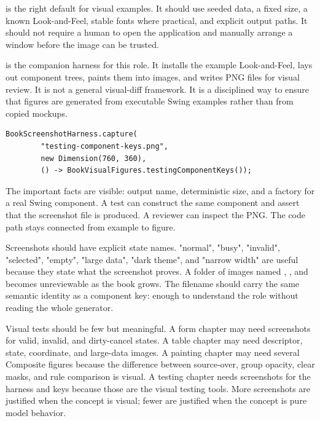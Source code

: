  is the right default for visual examples. It should use seeded data, a fixed size, a known Look-and-Feel, stable fonts where practical, and explicit output paths. It should not require a human to open the application and manually arrange a window before the image can be trusted.

 is the companion harness for this role. It installs the example Look-and-Feel, lays out component trees, paints them into images, and writes PNG files for visual review. It is not a general visual-diff framework. It is a disciplined way to ensure that figures are generated from executable Swing examples rather than from copied mockups.

\begin{lstlisting}[caption={The shape of a screenshot harness entry.}]
BookScreenshotHarness.capture(
        "testing-component-keys.png",
        new Dimension(760, 360),
        () -> BookVisualFigures.testingComponentKeys());
\end{lstlisting}

The important facts are visible: output name, deterministic size, and a factory for a real Swing component. A test can construct the same component and assert that the screenshot file is produced. A reviewer can inspect the PNG. The code path stays connected from example to figure.

Screenshots should have explicit state names. "normal", "busy", "invalid", "selected", "empty", "large data", "dark theme", and "narrow width" are useful because they state what the screenshot proves. A folder of images named , , and  becomes unreviewable as the book grows. The filename should carry the same semantic identity as a component key: enough to understand the role without reading the whole generator.

Visual tests should be few but meaningful. A form chapter may need screenshots for valid, invalid, and dirty-cancel states. A table chapter may need descriptor, state, coordinate, and large-data images. A painting chapter may need several Composite figures because the difference between source-over, group opacity, clear masks, and rule comparison is visual. A testing chapter needs screenshots for the harness and keys because those are the visual testing tools. More screenshots are justified when the concept is visual; fewer are justified when the concept is pure model behavior.

